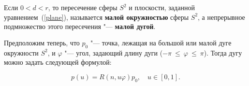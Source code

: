 \begin{definition}
Если $0<d<r$, то пересечение сферы $S^2$ и плоскости, заданной уравнением~(\ref{plane}), называется \textbf{малой
окружностью} сферы $S^2$, а непрерывное подмножество этого пересечения "--- \textbf{малой дугой}.
\end{definition}

Предположим теперь, что $p_0$ "--- точка, лежащая на большой или малой дуге окружности $S^2$, и $\varphi$ "--- угол,
задающий длину дуги ($-\pi~\le~\varphi~\le~\pi$). Тогда дугу можно задать следующей формулой:

$$
p(u)=R(n,u\varphi)p_0, \quad u \in [0,1].
$$
